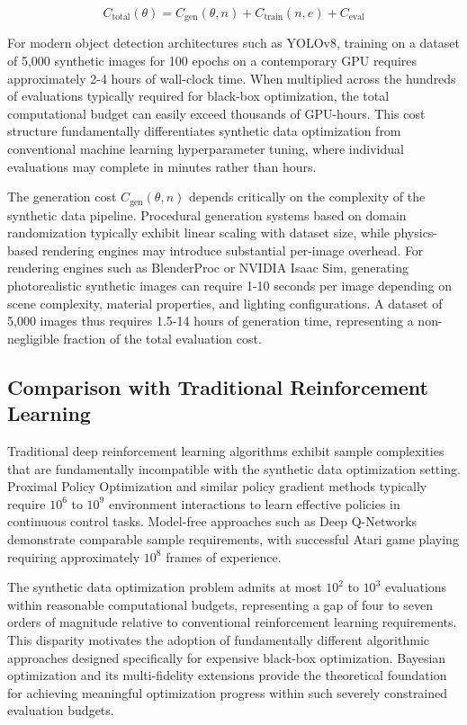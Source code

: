 \begin{equation}
C_{\text{total}}(\theta) = C_{\text{gen}}(\theta, n) + C_{\text{train}}(n, e) + C_{\text{eval}}
\label{eq:total_cost}
\end{equation}

For modern object detection architectures such as YOLOv8, training on a dataset of 5,000 synthetic images for 100 epochs on a contemporary GPU requires approximately 2-4 hours of wall-clock time. When multiplied across the hundreds of evaluations typically required for black-box optimization, the total computational budget can easily exceed thousands of GPU-hours. This cost structure fundamentally differentiates synthetic data optimization from conventional machine learning hyperparameter tuning, where individual evaluations may complete in minutes rather than hours.

The generation cost $C_{\text{gen}}(\theta, n)$ depends critically on the complexity of the synthetic data pipeline. Procedural generation systems based on domain randomization typically exhibit linear scaling with dataset size, while physics-based rendering engines may introduce substantial per-image overhead. For rendering engines such as BlenderProc or NVIDIA Isaac Sim, generating photorealistic synthetic images can require 1-10 seconds per image depending on scene complexity, material properties, and lighting configurations. A dataset of 5,000 images thus requires 1.5-14 hours of generation time, representing a non-negligible fraction of the total evaluation cost.

\subsection{Comparison with Traditional Reinforcement Learning}

Traditional deep reinforcement learning algorithms exhibit sample complexities that are fundamentally incompatible with the synthetic data optimization setting. Proximal Policy Optimization and similar policy gradient methods typically require $10^6$ to $10^9$ environment interactions to learn effective policies in continuous control tasks. Model-free approaches such as Deep Q-Networks demonstrate comparable sample requirements, with successful Atari game playing requiring approximately $10^8$ frames of experience.

The synthetic data optimization problem admits at most $10^2$ to $10^3$ evaluations within reasonable computational budgets, representing a gap of four to seven orders of magnitude relative to conventional reinforcement learning requirements. This disparity motivates the adoption of fundamentally different algorithmic approaches designed specifically for expensive black-box optimization. Bayesian optimization and its multi-fidelity extensions provide the theoretical foundation for achieving meaningful optimization progress within such severely constrained evaluation budgets.

